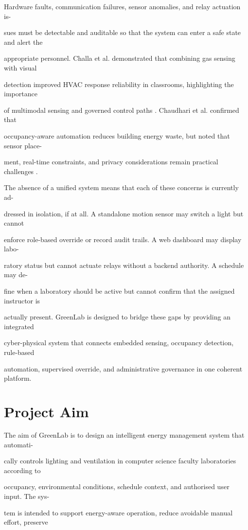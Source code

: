 Hardware faults, communication failures, sensor anomalies, and relay actuation is-

sues must be detectable and auditable so that the system can enter a safe state and alert the

appropriate personnel. Challa et al. demonstrated that combining gas sensing with visual

detection improved HVAC response reliability in classrooms, highlighting the importance

of multimodal sensing and governed control paths \cite{challa2025}. Chaudhari et al. conﬁrmed that

occupancy-aware automation reduces building energy waste, but noted that sensor place-

ment, real-time constraints, and privacy considerations remain practical challenges \cite{chaudhari2024}.

The absence of a uniﬁed system means that each of these concerns is currently ad-

dressed in isolation, if at all. A standalone motion sensor may switch a light but cannot

enforce role-based override or record audit trails. A web dashboard may display labo-

ratory status but cannot actuate relays without a backend authority. A schedule may de-

ﬁne when a laboratory should be active but cannot conﬁrm that the assigned instructor is

actually present. GreenLab is designed to bridge these gaps by providing an integrated

cyber-physical system that connects embedded sensing, occupancy detection, rule-based

automation, supervised override, and administrative governance in one coherent platform.


\section{Project Aim}
The aim of GreenLab is to design an intelligent energy management system that automati-

cally controls lighting and ventilation in computer science faculty laboratories according to

occupancy, environmental conditions, schedule context, and authorised user input. The sys-

tem is intended to support energy-aware operation, reduce avoidable manual effort, preserve

